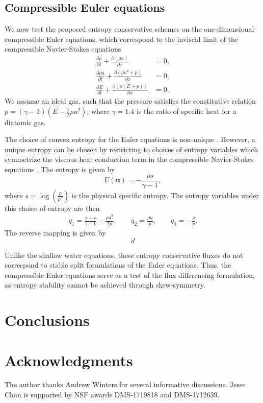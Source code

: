 \documentclass[preprint,10pt]{article}
\theoremstyle{definition}
\theoremstyle{lemma}
\theoremstyle{theorem}
\newcommand{\pd}[2]{\frac{\partial#1}{\partial#2}}
\newcommand{\LRp}[1]{\left( #1 \right)}
\newcommand{\note}[1]{{\color{blue}{#1}}}
\begin{document}
\subsection{Compressible Euler equations}

We now test the proposed entropy conservative schemes on the one-dimensional compressible Euler equations, which correspond to the inviscid limit of the compressible Navier-Stokes equations
\begin{align*}
\pd{\rho}{t} + \pd{\LRp{\rho u}}{x} &= 0,\\
\pd{\rho u}{t} + \pd{\LRp{\rho u^2 + p }}{x} &= 0,\\
\pd{E}{t} + \pd{\LRp{u(E+p)}}{x} &= 0.
\end{align*}
We assume an ideal gas, such that the pressure satisfies the constitutive relation $p = (\gamma-1)\LRp{E - \frac{1}{2}\rho u^2}$, where $\gamma = 1.4$ is the ratio of specific heat for a diatomic gas.    

The choice of convex entropy for the Euler equations is non-unique \cite{harten1983symmetric}.  However, a unique entropy can be chosen by restricting to choices of entropy variables which symmetrize the viscous heat conduction term in the compressible Navier-Stokes equations \cite{hughes1986new}.  The entropy is given by
\[
U(\bm{u}) = -\frac{\rho s}{\gamma-1},
\]
where $s = \log\LRp{\frac{p}{\rho^\gamma}}$ is the physical specific entropy.  The entropy variables under this choice of entropy are then
\begin{align*}
q_1 = \frac{\gamma-s}{\gamma-1} - \frac{\rho u^2}{2p}, \qquad q_2 = \frac{\rho u}{p}, \qquad q_3 = -\frac{\rho}{p}.
\end{align*}
The reverse mapping is given by 
\[
d
\]

\note{Add Chandreshekar's fluxes \cite{chandrashekar2013kinetic}.}

Unlike the shallow water equations, these entropy conservative fluxes do not correspond to stable split formulations of the Euler equations.  Thus, the compressible Euler equations serve as a test of the flux differencing formulation, as entropy stability cannot be achieved through skew-symmetry.  

\section{Conclusions}

\section{Acknowledgments}

The author thanks Andrew Winters for several informative discussions.  Jesse Chan is supported by NSF awards DMS-1719818 and DMS-1712639.  



\end{document}
